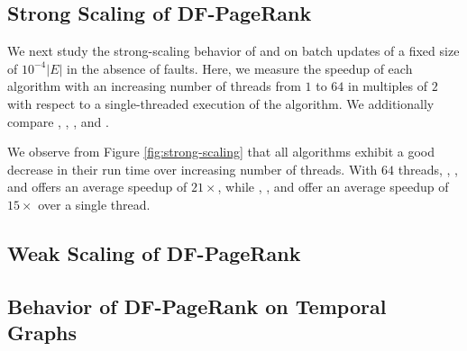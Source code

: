 














\subsection{Strong Scaling of DF-PageRank}

We next study the strong-scaling behavior of \FroWbar{} and \FroBarf{} on batch updates of a fixed size of $10^{-4} |E|$ in the absence of faults. Here, we measure the speedup of each algorithm with an increasing number of threads from $1$ to $64$ in multiples of $2$ with respect to a single-threaded execution of the algorithm. We additionally compare \StaWbar{}, \StaBarf{}, \NaiWbar{}, and \NaiBarf{}.

We observe from Figure \ref{fig:strong-scaling} that all algorithms exhibit a good decrease in their run time over increasing number of threads. With $64$ threads, \StaBarf{}, \NaiBarf{}, and \FroBarf{} offers an average speedup of $21\times$, while \StaWbar{}, \NaiWbar{}, and \FroWbar{} offer an average speedup of $15\times$ over a single thread.


\subsection{Weak Scaling of DF-PageRank}

\subsection{Behavior of DF-PageRank on Temporal Graphs}

